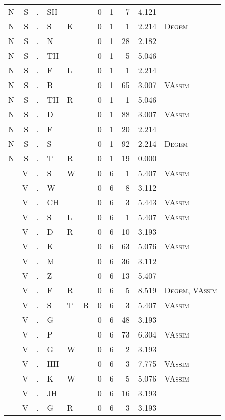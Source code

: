 \begin{longtable}{r@{ } r@{ } c@{ } l@{ } l@{ } l@{ } r r r r l }
N & S & . & SH &  &  & 0 & 1 & 7 & 4.121 &  \\
N & S & . & S & K &  & 0 & 1 & 1 & 2.214 & \textsc{Degem} \\
N & S & . & N &  &  & 0 & 1 & 28 & 2.182 &  \\
N & S & . & TH &  &  & 0 & 1 & 5 & 5.046 &  \\
N & S & . & F & L &  & 0 & 1 & 1 & 2.214 &  \\
N & S & . & B &  &  & 0 & 1 & 65 & 3.007 & \textsc{VAssim} \\
N & S & . & TH & R &  & 0 & 1 & 1 & 5.046 &  \\
N & S & . & D &  &  & 0 & 1 & 88 & 3.007 & \textsc{VAssim} \\
N & S & . & F &  &  & 0 & 1 & 20 & 2.214 &  \\
N & S & . & S &  &  & 0 & 1 & 92 & 2.214 & \textsc{Degem} \\
N & S & . & T & R &  & 0 & 1 & 19 & 0.000 &  \\
 & V & . & S & W &  & 0 & 6 & 1 & 5.407 & \textsc{VAssim} \\
 & V & . & W &  &  & 0 & 6 & 8 & 3.112 &  \\
 & V & . & CH &  &  & 0 & 6 & 3 & 5.443 & \textsc{VAssim} \\
 & V & . & S & L &  & 0 & 6 & 1 & 5.407 & \textsc{VAssim} \\
 & V & . & D & R &  & 0 & 6 & 10 & 3.193 &  \\
 & V & . & K &  &  & 0 & 6 & 63 & 5.076 & \textsc{VAssim} \\
 & V & . & M &  &  & 0 & 6 & 36 & 3.112 &  \\
 & V & . & Z &  &  & 0 & 6 & 13 & 5.407 &  \\
 & V & . & F & R &  & 0 & 6 & 5 & 8.519 & \textsc{Degem}, \textsc{VAssim} \\
 & V & . & S & T & R & 0 & 6 & 3 & 5.407 & \textsc{VAssim} \\
 & V & . & G &  &  & 0 & 6 & 48 & 3.193 &  \\
 & V & . & P &  &  & 0 & 6 & 73 & 6.304 & \textsc{VAssim} \\
 & V & . & G & W &  & 0 & 6 & 2 & 3.193 &  \\
 & V & . & HH &  &  & 0 & 6 & 3 & 7.775 & \textsc{VAssim} \\
 & V & . & K & W &  & 0 & 6 & 5 & 5.076 & \textsc{VAssim} \\
 & V & . & JH &  &  & 0 & 6 & 16 & 3.193 &  \\
 & V & . & G & R &  & 0 & 6 & 3 & 3.193 &  \\

\end{longtable}
